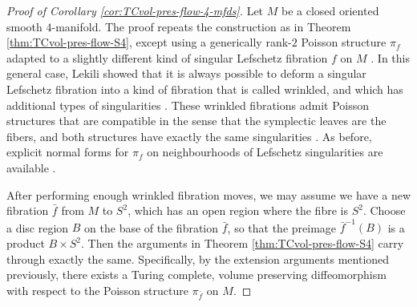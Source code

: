 \documentclass{amsart}
\begin{document}
\begin{proof}[Proof of Corollary \ref{cor:TCvol-pres-flow-4-mfds}]
Let $M$ be a closed oriented smooth $4$-manifold.
The proof repeats the construction as in Theorem \ref{thm:TCvol-pres-flow-S4}, except using a generically rank-$2$ Poisson structure $\pi_{f}$ adapted to a slightly different kind of singular Lefschetz fibration $f$ on $M$ \cite{GSV15, ST16}. 
In this general case, Lekili showed that it is always possible to deform a singular Lefschetz fibration into a kind of fibration that is called wrinkled, and which has additional types of singularities \cite{L}. 
These wrinkled fibrations admit Poisson structures that are compatible in the sense that the symplectic leaves are the fibers, and both structures have exactly the same singularities \cite{ST16}.
As before, explicit normal forms for $\pi_{f}$ on neighbourhoods of Lefschetz singularities are available \cite{ST16}.

After performing enough wrinkled fibration moves, we may assume we have a new fibration $\bar{f}$ from $M$ to $S^2$, which has an open region where the fibre is $S^2$.
%
Choose a disc region $B$ on the base of the fibration $\bar{f}$, so that the preimage $\bar{f}^{-1}(B)$ is a product $B\times S^2$.  
Then the arguments in Theorem \ref{thm:TCvol-pres-flow-S4} carry through exactly the same.
Specifically, by the extension arguments mentioned previously, there exists a Turing complete, volume preserving diffeomorphism with respect to the Poisson structure $\pi_{\bar{f}}$ on $M$.  
\end{proof}%

%

\end{document}

